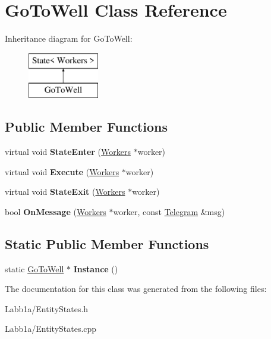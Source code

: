 \hypertarget{class_go_to_well}{}\section{Go\+To\+Well Class Reference}
\label{class_go_to_well}
Inheritance diagram for Go\+To\+Well\+:\begin{figure}[H]
\begin{center}
\leavevmode
\includegraphics[height=2.000000cm]{class_go_to_well}
\end{center}
\end{figure}
\subsection*{Public Member Functions}
\begin{DoxyCompactItemize}
\item 
\hypertarget{class_go_to_well_ae31941876646a91c2f8633ad31fb17bc}{}virtual void {\bfseries State\+Enter} (\hyperlink{class_workers}{Workers} $\ast$worker)\label{class_go_to_well_ae31941876646a91c2f8633ad31fb17bc}

\item 
\hypertarget{class_go_to_well_ab15f179542a09f574f11ad2bd51adc13}{}virtual void {\bfseries Execute} (\hyperlink{class_workers}{Workers} $\ast$worker)\label{class_go_to_well_ab15f179542a09f574f11ad2bd51adc13}

\item 
\hypertarget{class_go_to_well_a95e9c640e504ee3e8e66ca08ae400962}{}virtual void {\bfseries State\+Exit} (\hyperlink{class_workers}{Workers} $\ast$worker)\label{class_go_to_well_a95e9c640e504ee3e8e66ca08ae400962}

\item 
\hypertarget{class_go_to_well_af224556cb446a38030fab5bf2f9ad4d8}{}bool {\bfseries On\+Message} (\hyperlink{class_workers}{Workers} $\ast$worker, const \hyperlink{struct_telegram}{Telegram} \&msg)\label{class_go_to_well_af224556cb446a38030fab5bf2f9ad4d8}

\end{DoxyCompactItemize}
\subsection*{Static Public Member Functions}
\begin{DoxyCompactItemize}
\item 
\hypertarget{class_go_to_well_a99c5b8a23dbdaeb3c7d6b003fa849d30}{}static \hyperlink{class_go_to_well}{Go\+To\+Well} $\ast$ {\bfseries Instance} ()\label{class_go_to_well_a99c5b8a23dbdaeb3c7d6b003fa849d30}

\end{DoxyCompactItemize}


The documentation for this class was generated from the following files\+:\begin{DoxyCompactItemize}
\item 
Labb1a/Entity\+States.\+h\item 
Labb1a/Entity\+States.\+cpp\end{DoxyCompactItemize}
